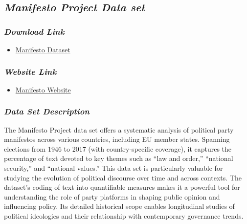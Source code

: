 \documentclass[
]{article}
\providecommand{\tightlist}{%
  \setlength{\itemsep}{0pt}\setlength{\parskip}{0pt}}\usepackage{longtable,booktabs,array}
\begin{document}
\subsection{\texorpdfstring{\emph{Manifesto Project Data
set}}{Manifesto Project Data set}}\label{manifesto-project-data-set}

\subsubsection{\texorpdfstring{\emph{Download
Link}}{Download Link}}\label{download-link-2}

\begin{itemize}
\tightlist
\item
  \href{https://manifesto-project.wzb.eu/down/data/2024a/datasets/MPDataset_MPDS2024a.csv}{Manifesto
  Dataset}
\end{itemize}

\subsubsection{\texorpdfstring{\emph{Website
Link}}{Website Link}}\label{website-link-2}

\begin{itemize}
\tightlist
\item
  \href{https://manifesto-project.wzb.eu/datasets}{Manifesto Website}
\end{itemize}

\subsubsection{\texorpdfstring{\emph{Data Set
Description}}{Data Set Description}}\label{data-set-description-2}

The Manifesto Project data set offers a systematic analysis of political
party manifestos across various countries, including EU member states.
Spanning elections from 1946 to 2017 (with country-specific coverage),
it captures the percentage of text devoted to key themes such as ``law
and order,'' ``national security,'' and ``national values.'' This data
set is particularly valuable for studying the evolution of political
discourse over time and across contexts. The dataset's coding of text
into quantifiable measures makes it a powerful tool for understanding
the role of party platforms in shaping public opinion and influencing
policy. Its detailed historical scope enables longitudinal studies of
political ideologies and their relationship with contemporary governance
trends.
\end{document}
